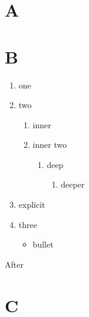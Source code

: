 \documentclass{article}
\newcounter{step}[section]
\begin{document}
\section{A}\label{s1}
\section{B}\label{s2}
\begin{enumerate}
\item one\label{i1}
\item two\label{i2}
  \begin{enumerate}
  \item inner\label{i2a}
  \item inner two\label{i2b}
    \begin{enumerate}
    \item deep\label{i2b1}
      \begin{enumerate}
      \item deeper\label{i2b1a}
      \end{enumerate}
    \end{enumerate}
  \end{enumerate}
\item[x] explicit\label{ix}
\item three\label{i3}
  \begin{itemize}
  \item bullet\label{ib}
  \end{itemize}
\end{enumerate}
After\label{after}
\label{st1}
\label{st2}
\label{st3}
\section{C}\label{s3}
\label{st4}
\end{document}

